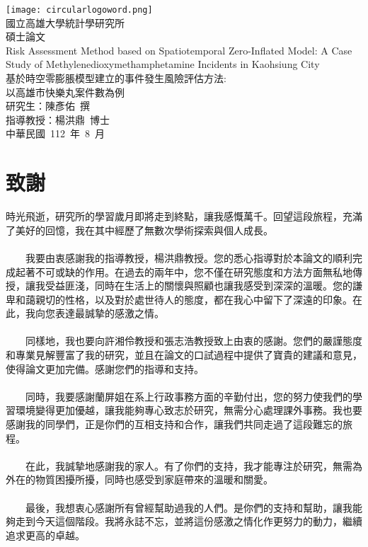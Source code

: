 \documentclass[12pt,a4paper]{article}
\begin{document}
\begin{CJK}{UTF8}{bkai}

\renewcommand\tablename{表}
\renewcommand\figurename{圖}
\begin{titlepage}
\centering\texttt{[image: circularlogoword.png]}\\[1cm]
\Large{國立高雄大學統計學研究所}\\
碩士論文\\[3cm]
{Risk Assessment Method based on Spatiotemporal Zero-Inflated Model: A Case Study of Methylenedioxymethamphetamine Incidents in Kaohsiung City}
\\
基於時空零膨脹模型建立的事件發生風險評估方法:\\以高雄市快樂丸案件數為例\\[3cm]

研究生：陳彥佑\ 撰\\
指導教授：楊洪鼎\ 博士\\[1cm]



中華民國~112~年~8~月

\end{titlepage}

\section*{致謝}
\thispagestyle{empty}
時光飛逝，研究所的學習歲月即將走到終點，讓我感慨萬千。回望這段旅程，充滿了美好的回憶，我在其中經歷了無數次學術探索與個人成長。\\
\\
　　我要由衷感謝我的指導教授，楊洪鼎教授。您的悉心指導對於本論文的順利完成起著不可或缺的作用。在過去的兩年中，您不僅在研究態度和方法方面無私地傳授，讓我受益匪淺，同時在生活上的關懷與照顧也讓我感受到深深的溫暖。您的謙卑和藹親切的性格，以及對於處世待人的態度，都在我心中留下了深遠的印象。在此，我向您表達最誠摯的感激之情。\\
\\
　　同樣地，我也要向許湘伶教授和張志浩教授致上由衷的感謝。您們的嚴謹態度和專業見解豐富了我的研究，並且在論文的口試過程中提供了寶貴的建議和意見，使得論文更加完備。感謝您們的指導和支持。\\
\\
　　同時，我要感謝蘭屏姐在系上行政事務方面的辛勤付出，您的努力使我們的學習環境變得更加優越，讓我能夠專心致志於研究，無需分心處理課外事務。我也要感謝我的同學們，正是你們的互相支持和合作，讓我們共同走過了這段難忘的旅程。\\
\\
　　在此，我誠摯地感謝我的家人。有了你們的支持，我才能專注於研究，無需為外在的物質困擾所擾，同時也感受到家庭帶來的溫暖和關愛。\\
\\
　　最後，我想衷心感謝所有曾經幫助過我的人們。是你們的支持和幫助，讓我能夠走到今天這個階段。我將永誌不忘，並將這份感激之情化作更努力的動力，繼續追求更高的卓越。\\


\end{CJK}
\end{document}
